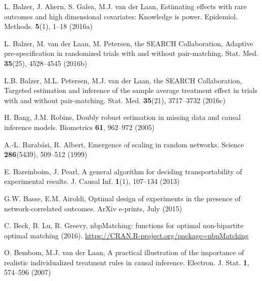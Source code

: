 \begin{list}{}{\setlength{\leftmargin}{2.1em}\setlength{\labelwidth}{0pt}
  \setlength{\labelsep}{0pt}\setlength{\itemindent}{-2.1em}
  \setlength{\parsep}{0pt}\setlength{\itemsep}{2pt}\setlength{\topsep}{0pt}}
\item\label{refentry:REF017}L. Balzer, J. Ahern, S. Galea, M.J. van der Laan, Estimating effects with rare outcomes and high dimensional covariates: Knowledge is power. Epidemiol. Methods. \textbf{5}(1), 1--18 (2016a)\label{refend:REF017}
\item\label{refentry:REF018}L. Balzer, M. van der Laan, M. Petersen, the SEARCH Collaboration, Adaptive pre-specification in randomized trials with and without pair-matching. Stat. Med. \textbf{35}(25), 4528--4545 (2016b)\label{refend:REF018}
\item\label{refentry:REF019}L.B. Balzer, M.L. Petersen, M.J. van der Laan, the SEARCH Collaboration, Targeted estimation and inference of the sample average treatment effect in trials with and without pair-matching. Stat. Med. \textbf{35}(21), 3717--3732 (2016c)\label{refend:REF019}
\item\label{refentry:REF020}H. Bang, J.M. Robins, Doubly robust estimation in missing data and causal inference models. Biometrics \textbf{61}, 962--972 (2005)\label{refend:REF020}
\item\label{refentry:REF021}A.-L. Barabási, R. Albert, Emergence of scaling in random networks. Science \textbf{286}(5439), 509--512 (1999)\label{refend:REF021}
\item\label{refentry:REF022}E. Bareinboim, J. Pearl, A general algorithm for deciding transportability of experimental results. J. Causal Inf. \textbf{1}(1), 107--134 (2013)\label{refend:REF022}
\item\label{refentry:REF023}G.W. Basse, E.M. Airoldi, Optimal design of experiments in the presence of network-correlated outcomes. ArXiv e-prints, July (2015)\label{refend:REF023}
\item\label{refentry:REF024}C. Beck, B. Lu, R. Greevy, nbpMatching: functions for optimal non-bipartite optimal matching (2016). \url{https://CRAN.R-project.org/package=nbpMatching}\label{refend:REF024}
\item\label{refentry:REF025}O. Bembom, M.J. van der Laan, A practical illustration of the importance of realistic individualized treatment rules in causal inference. Electron. J. Stat. \textbf{1}, 574--596 (2007)\label{refend:REF025}

\end{list}
